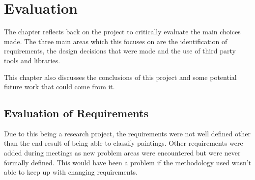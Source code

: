 \chapter{Evaluation}

The chapter reflects back on the project to critically evaluate the main choices made. The three
main areas which this focuses on are the identification of requirements, the design decisions that
were made and the use of third party tools and libraries.

This chapter also discusses the conclusions of this project and some potential future work that could
come from it.





\section{Evaluation of Requirements}
Due to this being a research project, the requirements were not well defined other than the end 
result of being able to classify paintings. Other requirements were added during meetings as new
problem areas were encountered but were never formally defined. This would have been a problem if 
the methodology used wasn't able to keep up with changing requirements.

